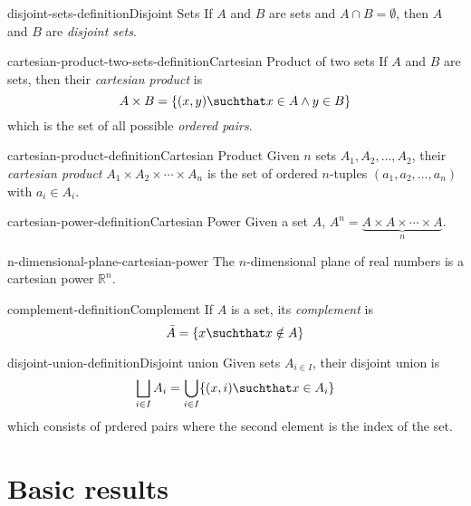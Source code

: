 \documentclass[preview]{standalone}
\begin{document}
\begin{snippetdefinition}{disjoint-sets-definition}{Disjoint Sets}
    If \(A\) and \(B\) are sets and \(A \cap B = \emptyset \), then \(A\)
    and \(B\) are \textit{disjoint sets}.
\end{snippetdefinition}

\begin{snippetdefinition}{cartesian-product-two-sets-definition}{Cartesian Product of two sets}
    If \(A\) and \(B\) are sets, then their \textit{cartesian product} is
    \[
        A\times B = \{(x,y) \suchthat x \in A \land y \in B\}
    \]
    which is the set of all possible \textit{ordered pairs}.
\end{snippetdefinition}

\begin{snippetdefinition}{cartesian-product-definition}{Cartesian Product}
    Given \(n\) sets \(A_1, A_2, \ldots, A_2\),
    their \textit{cartesian product} \(A_1 \times A_2 \times \cdots \times A_n\)
    is the set of ordered \(n\)-tuples \((a_1, a_2, \ldots, a_n)\) with \(a_i\in A_i\).
\end{snippetdefinition}

\begin{snippetdefinition}{cartesian-power-definition}{Cartesian Power}
    Given a set \(A\), \(A^n=\underbrace{A\times A\times \cdots \times A}_n\).
\end{snippetdefinition}

\begin{snippet}{n-dimensional-plane-cartesian-power}
    The \(n\)-dimensional plane of real numbers is a cartesian power \({\mathbb{R}}^n\).
\end{snippet}

\begin{snippetdefinition}{complement-definition}{Complement}
    If \(A\) is a set, its \textit{complement} is
    \[
        \bar{A} = \{x \suchthat x \notin A\}
    \]
\end{snippetdefinition}

\begin{snippetdefinition}{disjoint-union-definition}{Disjoint union}
    Given sets \(A_{i\in I}\), their disjoint union is
    \[
        \bigsqcup_{i\in I}A_i= \bigcup_{i\in I}\{(x, i) \suchthat x \in A_i\}
    \]
    which consists of prdered pairs where the second element
    is the index of the set.
\end{snippetdefinition}

\section{Basic results}
\end{document}
